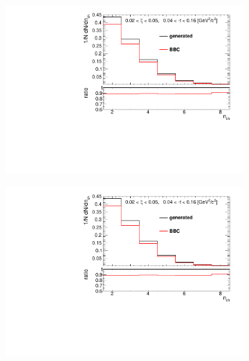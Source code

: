 \begin{figure}[h!]
	\centering
	\begin{subfigure}{.45\textwidth}
		\includegraphics[width=\textwidth,page=5]{chapters/chrgSTAR/img/bbcCorrection/xi_bbc.pdf}
	\end{subfigure}
	\begin{subfigure}{.45\textwidth}
		\includegraphics[width=\textwidth,page=6]{chapters/chrgSTAR/img/bbcCorrection/xi_bbc.pdf}
	\end{subfigure}
	\begin{subfigure}{.45\textwidth}

\end{subfigure}
\end{figure}
